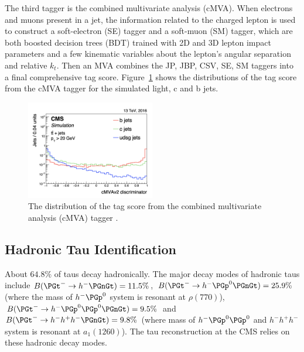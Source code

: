 The third tagger is the combined multivariate analysis (cMVA). When electrons and muons present in a jet, the information related to the charged lepton is used to construct a soft-electron (SE) tagger and a soft-muon (SM) tagger, which are both boosted decision trees (BDT) trained with 2D and 3D lepton impact parameters and a few kinematic variables about the lepton's angular separation and relative $k_t$. Then an MVA combines the JP, JBP, CSV, SE, SM taggers into a final comprehensive \PQb tag score. Figure~\ref{fig:cmsExperiment:reconstruction:cMVA} shows the distributions of the \PQb tag score from the cMVA \PQb tagger for the simulated light, c and b jets.

\begin{figure}[ht]
    \centering
    \includegraphics[width=0.5\textwidth]{chapters/CMSExperiment/sectionReconstruction/figures/cMVA}
    \caption{The distribution of the \PQb tag score from the combined multivariate analysis (cMVA) \PQb tagger \cite{Sirunyan:2017ezt}. }
    \label{fig:cmsExperiment:reconstruction:cMVA}
\end{figure}





\subsection{Hadronic Tau Identification}

About $64.8\%$ of taus decay hadronically. The major decay modes of hadronic taus include $B(\PGt^- \to h^- \PGnGt)=11.5\% $, $B(\PGt^- \to h^- \PGp^0 \PGnGt)=25.9\% $ (where the mass of $h^-\PGp^0$ system is resonant at $\rho(770)$), $B(\PGt^- \to h^- \PGp^0 \PGp^0 \PGnGt)=9.5\% $ and $B(\PGt^- \to h^- h^+ h^- \PGnGt)=9.8\% $ (where mass of $h^- \PGp^0 \PGp^0$ and $h^- h^+ h^- $ system is resonant at $a_1(1260)$). The tau reconstruction at the CMS relies on these hadronic decay modes.

